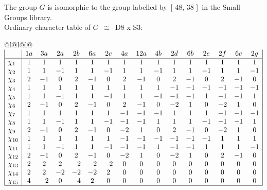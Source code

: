 \documentclass[varwidth=\maxdimen,border=10]{standalone}
\begin{document}
The group $G$ is isomorphic to the group labelled by\ [ 48, 38 ]\ in the Small Groups library.\\
Ordinary character table of $G$\ $\cong$\ D8 x S3:\\
\begin{center}
\begin{tabular}{@{}l@{}l@{}l@{}}
\hline
\(\begin{array}{|l|ccccccccccccccc|}
  & 1a & 3a & 2a & 2b & 6a & 2c & 4a & 12a & 4b & 2d & 6b & 2e & 2f & 6c & 2g\\ \hline
\chi_{1} & 1 & 1 & 1 & 1 & 1 & 1 & 1 & 1 & 1 & 1 & 1 & 1 & 1 & 1 & 1\\
\chi_{2} & 1 & 1 & -1 & 1 & 1 & -1 & 1 & 1 & -1 & 1 & 1 & -1 & 1 & 1 & -1\\
\chi_{3} & 2 & -1 & 0 & 2 & -1 & 0 & 2 & -1 & 0 & 2 & -1 & 0 & 2 & -1 & 0\\
\chi_{4} & 1 & 1 & 1 & 1 & 1 & 1 & 1 & 1 & 1 & -1 & -1 & -1 & -1 & -1 & -1\\
\chi_{5} & 1 & 1 & -1 & 1 & 1 & -1 & 1 & 1 & -1 & -1 & -1 & 1 & -1 & -1 & 1\\
\chi_{6} & 2 & -1 & 0 & 2 & -1 & 0 & 2 & -1 & 0 & -2 & 1 & 0 & -2 & 1 & 0\\
\chi_{7} & 1 & 1 & 1 & 1 & 1 & 1 & -1 & -1 & -1 & 1 & 1 & 1 & -1 & -1 & -1\\
\chi_{8} & 1 & 1 & -1 & 1 & 1 & -1 & -1 & -1 & 1 & 1 & 1 & -1 & -1 & -1 & 1\\
\chi_{9} & 2 & -1 & 0 & 2 & -1 & 0 & -2 & 1 & 0 & 2 & -1 & 0 & -2 & 1 & 0\\
\chi_{10} & 1 & 1 & 1 & 1 & 1 & 1 & -1 & -1 & -1 & -1 & -1 & -1 & 1 & 1 & 1\\
\chi_{11} & 1 & 1 & -1 & 1 & 1 & -1 & -1 & -1 & 1 & -1 & -1 & 1 & 1 & 1 & -1\\
\chi_{12} & 2 & -1 & 0 & 2 & -1 & 0 & -2 & 1 & 0 & -2 & 1 & 0 & 2 & -1 & 0\\
\chi_{13} & 2 & 2 & 2 & -2 & -2 & -2 & 0 & 0 & 0 & 0 & 0 & 0 & 0 & 0 & 0\\
\chi_{14} & 2 & 2 & -2 & -2 & -2 & 2 & 0 & 0 & 0 & 0 & 0 & 0 & 0 & 0 & 0\\
\chi_{15} & 4 & -2 & 0 & -4 & 2 & 0 & 0 & 0 & 0 & 0 & 0 & 0 & 0 & 0 & 0\\
\hline
\end{array}\)\\
\end{tabular}
\end{center}
\end{document}
